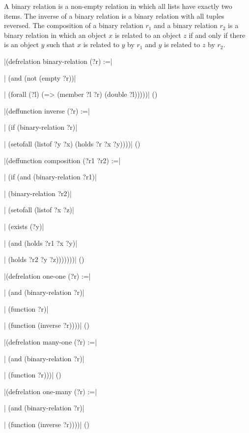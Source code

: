 A binary relation is a non-empty relation in which all lists have exactly two
items.  The inverse of a binary relation is a binary relation with all
tuples reversed.  The composition of a binary relation $r_1$ and a binary
relation $r_2$ is a binary relation in which an object $x$ is related to an
object $z$ if and only if there is an object $y$ such that $x$ is related to
$y$ by $r_1$ and $y$ is related to $z$ by $r_2$.

\medskip
\verbatim|(defrelation binary-relation (?r) :=|\par
\verbatim|  (and (not (empty ?r))|\par
\verbatim|       (forall (?l) (=> (member ?l ?r) (double ?l)))))|
\hfill(\equation)\par
\medskip

\medskip
\verbatim|(deffunction inverse (?r) :=|\par
\verbatim|  (if (binary-relation ?r)|\par
\verbatim|      (setofall (listof ?y ?x) (holds ?r ?x ?y))))|
\hfill(\equation)\par
\medskip

\medskip
\verbatim|(deffunction composition (?r1 ?r2) :=|\par
\verbatim|  (if (and (binary-relation ?r1)|\par
\verbatim|           (binary-relation ?r2)|\par
\verbatim|      (setofall (listof ?x ?z)|\par
\verbatim|        (exists (?y)|\par
\verbatim|          (and (holds ?r1 ?x ?y)|\par
\verbatim|               (holds ?r2 ?y ?z)))))))|
\hfill(\equation)\par
\medskip

\medskip
\verbatim|(defrelation one-one (?r) :=|\par
\verbatim|  (and (binary-relation ?r)|\par
\verbatim|       (function ?r)|\par
\verbatim|       (function (inverse ?r))))|
\hfill(\equation)\par
\medskip

\medskip
\verbatim|(defrelation many-one (?r) :=|\par
\verbatim|  (and (binary-relation ?r)|\par
\verbatim|       (function ?r)))|
\hfill(\equation)\par
\medskip

\medskip
\verbatim|(defrelation one-many (?r) :=|\par
\verbatim|  (and (binary-relation ?r)|\par
\verbatim|       (function (inverse ?r))))|
\hfill(\equation)\par
\medskip

